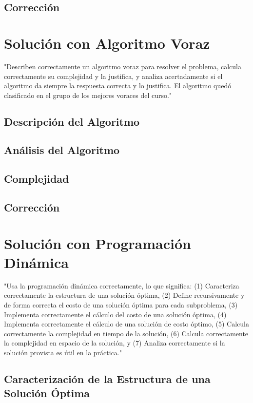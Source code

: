\documentclass[letterpaper,10pt]{article}
\begin{document}
\subsection{Corrección}
\label{subsec:correccion_fuerza_bruta}

\section{Solución con Algoritmo Voraz}
\label{sec:algoritmo_voraz}
"Describen correctamente un algoritmo voraz para resolver el problema, calcula correctamente su complejidad y la justifica, y analiza acertadamente si el algoritmo da siempre la respuesta correcta y lo justifica. El algoritmo quedó clasificado en el grupo de los mejores voraces del curso."
\subsection{Descripción del Algoritmo}
\label{subsec:descripcion_algoritmo_voraz}
\subsection{Análisis del Algoritmo}
\label{subsec:analisis_algoritmo_voraz}
\subsection{Complejidad}
\label{subsec:complejidad_algoritmo_voraz}
\subsection{Corrección}
\label{subsec:correccion_algoritmo_voraz}

\section{Solución con Programación Dinámica}
\label{sec:programacion_dinamica}
"Usa la programación dinámica correctamente, lo que significa: (1) Caracteriza correctamente la estructura de una solución óptima, (2) Define recursivamente y de forma correcta el costo de una solución óptima para cada subproblema, (3) Implementa correctamente el cálculo del costo de una solución óptima, (4) Implementa correctamente el cálculo de una solución de costo óptimo, (5) Calcula correctamente la complejidad en tiempo de la solución, (6) Calcula correctamente la complejidad en espacio de la solución, y (7) Analiza correctamente si la solución provista es útil en la práctica."
\subsection{Caracterización de la Estructura de una Solución Óptima}
\label{subsec:caracterizacion_solucion_optima}
\end{document}
